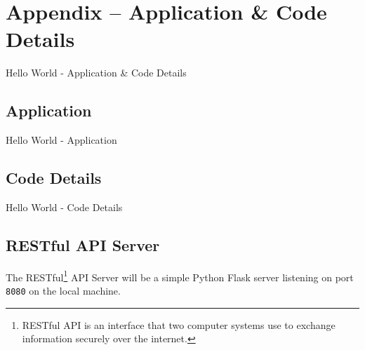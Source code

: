\section{Appendix -- Application \& Code Details}
Hello World - Application \& Code Details
\subsection{Application}
\label{appendix:code_application}
Hello World - Application
\clearpage

\subsection{Code Details}
Hello World - Code Details

\subsection{RESTful API Server}
\label{appendix:code-api-server}
The RESTful\footnote{RESTful API is an interface that two computer systems use to exchange information securely over the internet.} API Server will be a simple Python Flask server listening on port \texttt{8080} on the local machine.


\clearpage
